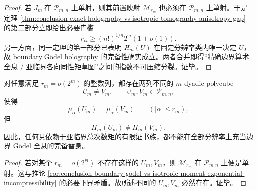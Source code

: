\begin{proof}
若 \(J_m\) 在 \(\mathcal P_{m,n}\) 上单射，则其前置映射 \(\mathcal M_{r_m}\) 也必须在 \(\mathcal P_{m,n}\) 上单射。于是定理 \ref{thm:conclusion-exact-holography-vs-isotropic-tomography-anisotropy-gap} 的第二部分立即给出必要门槛
\[
r_m\ge (n!)^{1/n}2^m(1+o(1)).
\]
另一方面，同一定理的第一部分已表明 \(H_m(U)\) 在固定分辨率类内唯一决定 \(U\)，故 boundary Gödel holography 的完备性确实成立。两者合并即得“精确边界算术全息 / 亚临界各向同性矩草图”之间的指数不可压缩分裂。证毕。
\end{proof}

\begin{corollary}\label{cor:conclusion-subcritical-isotropic-moment-certificates-incomplete-across-resolutions}
对任意满足 \(r_m=o(2^m)\) 的整数列，都存在两列不同的 \(m\)-dyadic polycube
\[
U_m\neq V_m,
\qquad
U_m,V_m\in \mathcal P_{m,n},
\]
使得
\[
\mu_\alpha(U_m)=\mu_\alpha(V_m)
\qquad (|\alpha|\le r_m),
\]
但
\[
H_m(U_m)\neq H_m(V_m).
\]
因此，任何只依赖于亚临界总次数矩的有限证书族，都不能在全部分辨率上充当边界 Gödel 全息的完备替身。
\end{corollary}

\begin{proof}
若对某个 \(r_m=o(2^m)\) 不存在这样的 \(U_m,V_m\)，则 \(\mathcal M_{r_m}\) 在 \(\mathcal P_{m,n}\) 上便是单射。这与推论 \ref{cor:conclusion-boundary-godel-vs-isotropic-moment-exponential-incompressibility} 的必要下界矛盾。故所述不同的 \(U_m,V_m\) 必然存在。证毕。
\end{proof}

